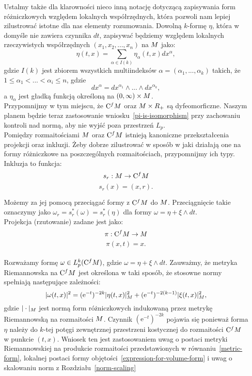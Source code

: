 \documentclass[licencjacka]{pracamgr}
\theoremstyle{definition}
\theoremstyle{definition}
\theoremstyle{plain}
\theoremstyle{plain}
\theoremstyle{plain}
\theoremstyle{plain}
\theoremstyle{plain}
\def\cfm{\ensuremath\mathrm{C}^fM}
\def\M{\ensuremath M}
\begin{document}
Ustalmy także dla klarowności nieco inną notację dotyczącą zapisywania
form różniczkowych względem lokalnych współrzędnych, która pozwoli nam 
lepiej zilustrować istotne dla nas elementy rozumowania. Dowolną $k$-formę $\eta$,
która w domyśle nie zawiera czynnika $dt$, zapisywać będziemy względem
lokalnych rzeczywistych współrzędnych
$(x_1, x_2, ... , x_n)$ na $\M$ jako:
\[
    \eta(t, x) = \sum_{\alpha \in I(k)} \eta_\alpha (t, x) dx^\alpha,
\]
gdzie $I(k)$ jest zbiorem wszystkich multiindeksów $\alpha = (\alpha_1, ...,
\alpha_k)$ takich, że $1 \leq \alpha_1 < ... < \alpha_i \leq n$, gdzie
\begin{equation}\label{notacja}
    dx^\alpha = dx^{\alpha_1} \wedge ... \wedge dx^{\alpha_k},
\end{equation}
a $\eta_\alpha$ jest gładką funkcją określoną na $(0, \infty) \times \M$. \\

Przypomnijmy w tym miejscu, że $\cfm$ oraz $\M \times R_+$ są
dyfeomorficzne.  Naszym planem będzie teraz zastosowanie
wniosku~\ref{pi-is-isomorphism} przy zachowaniu kontroli nad normą,
aby nie wyjść poza przestrzeń $L_p$. \\



Pomiędzy rozmaitościami $\M$ oraz $\cfm$ istnieją kanoniczne przekształcenia
projekcji oraz inkluzji. Żeby dobrze zilustrować w sposób w jaki działają one
na formy różniczkowe na poszczególnych rozmaitościach, przypomnijmy ich typy.
Inkluzja to funkcja:
\[
    s_r: \M \rightarrow \cfm \\
\]
\[
    s_r(x) = (x, r).
\]

Możemy za jej pomocą przeciągać formy z $\cfm$ do $\M$. Przeciągnięcie takie
oznaczymy jako $\omega_r = s_r^\ast(\omega) = s_r^\ast (\eta) $ dla formy $\omega
= \eta + \xi \wedge dt$. \\
Projekcja (rzutowanie) zadane jest jako:
\[
    \pi: \cfm \rightarrow \M
\]
\[
    \pi (x, t) = x.
\] \\


Rozważamy formę $\omega \in L^k_p (\cfm)$, gdzie
$\omega = \eta + \xi \wedge dt$.
Zauważmy, że metryka Riemannowska na $\cfm$ jest określona w taki sposób, że
stosowne normy spełniają następujące zależności:
\begin{equation}\label{cfm-norms-scaling}
| \omega(t,x) |^2 = (\mathrm{e}^{-t})^{-2k} | \eta(t,x) |^2_{\M} +
(\mathrm{e}^{-t})^{-2(k-1)} | \xi(t,x) |^2_{\M},
\end{equation}
gdzie $|\cdot |_{\M} $ jest normą form różniczkowych indukowaną przez
metrykę Riemannowską na rozmaitości $\M$.  Czynnik $(\mathrm{e}^{-t})^{-2k}$
pojawia się ponieważ forma $\eta$ należy do $k$-tej potęgi zewnętrznej
przestrzeni kostycznej do rozmaitości $\cfm$ w punkcie $(t,x)$. 
Wniosek ten jest zastosowaniem uwag
o postaci metryki Riemannowskiej na produkcie
rozmaitości przedstawionych w równaniu~\ref{metric-form}, lokalnej
postaci formy objętości~\ref{expression-for-volume-form} i uwag
o skalowaniu norm z Rozdziału~\ref{norm-scaling} \\
\end{document}
